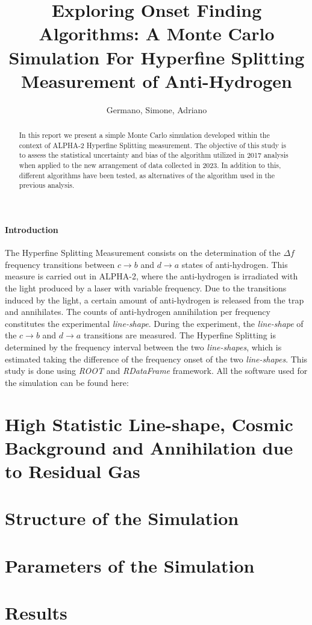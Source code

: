 \documentclass[11pt,a4paper,oneside]{article}
\title{%
 \vspace{-2.0cm}
 Exploring Onset Finding Algorithms: A Monte Carlo \\ Simulation For  Hyperfine Splitting Measurement of Anti-Hydrogen
}
\date{\vspace{-5ex}}
\author{Germano, Simone, Adriano}
\begin{document}

\maketitle
\begin{abstract}
\centering
In this report we present a simple Monte Carlo simulation developed within the context of ALPHA-2 Hyperfine Splitting measurement. The objective of this study is to assess the statistical uncertainty and bias of the algorithm utilized in 2017 analysis when applied to the new arrangement of data collected in 2023. In addition to this, different algorithms have been tested, as alternatives of the algorithm used in the previous analysis.
\end{abstract}

\paragraph{Introduction}

The Hyperfine Splitting Measurement consists on the determination of the $\Delta f$ frequency transitions between $c \rightarrow b$ and $ d \rightarrow a$ states of anti-hydrogen. This measure is carried out in ALPHA-2, where the anti-hydrogen is irradiated with the light produced by a laser with variable frequency. Due to the transitions induced by the light, a certain amount of anti-hydrogen is released from the trap and annihilates. The counts of anti-hydrogen annihilation per frequency constitutes the experimental \textit{line-shape}. During the experiment, the \textit{line-shape} of the $c \rightarrow b$ and $ d \rightarrow a$ transitions are measured. The Hyperfine Splitting is determined by the frequency interval between the two \textit{line-shapes}, which is estimated taking the difference of the frequency onset of the two \textit{line-shapes}. This study is done using \textit{ROOT} and \textit{RDataFrame} framework. All the software used for the simulation can be found here: {}

\section{High Statistic Line-shape, Cosmic Background and Annihilation due to Residual Gas}

\section{Structure of the Simulation}

\section{Parameters of the Simulation}

\section{Results}
\end{document}
